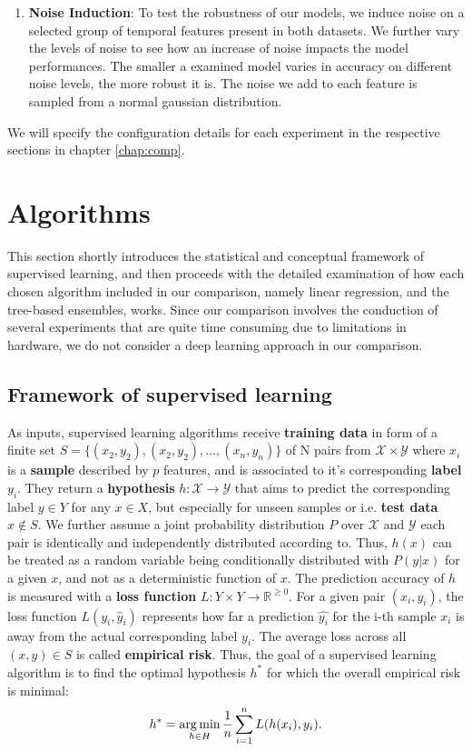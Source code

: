 \begin{enumerate}
	\item \textbf{Noise Induction}: To test the robustness of our models, we induce noise on a selected group of temporal features present in both datasets. We further vary the levels of noise to see how an increase of noise impacts the model performances. The smaller a examined model varies in accuracy on different noise levels, the more robust it is. The noise we add to each feature is sampled from a normal gaussian distribution. 
\end{enumerate}
We will specify the configuration details for each experiment in the respective sections in chapter \ref{chap:comp}.
\section{Algorithms}
This section shortly introduces the statistical and conceptual framework of supervised learning, and then proceeds with the detailed examination of how each chosen algorithm included in our comparison, namely linear regression, and the tree-based ensembles, works. Since our comparison involves the conduction of several experiments that are quite time consuming due to limitations in hardware, we do not consider a deep learning approach in our comparison. 

\subsection{Framework of supervised learning}
As inputs, supervised learning algorithms receive \textbf{training data} in form of a finite set $ S = \{({x}_{2}, y_2), ({x}_{2}, y_2), \dots, ({x}_{n}, y_n)\}$ of N pairs from $ \mathcal{X} \times \mathcal{Y} $ where $ x_i $ is a \textbf{sample} described by $ p $ features, and is associated to it's corresponding \textbf{label} $ y_i $.
They return a \textbf{hypothesis} $ h: \mathcal{X} \to \mathcal{Y} $ that aims to predict the corresponding label $ y \in Y $ for any $ x \in X $, but especially for unseen samples or i.e. \textbf{test data} $ x \notin S $.
We further assume a joint probability distribution $ P $ over $ \mathcal{X} $ and $ \mathcal{Y} $ each pair is identically and independently distributed according to. 
Thus, $ h(x) $ can be treated as a random variable being conditionally distributed with $ P(y | x) $ for a given $ x $, and not as a deterministic function of $ x $. 
The prediction accuracy of $ h $ is measured with a  \textbf{loss function} $ L : Y \times Y \to \mathbb{R}^{\geq 0}$.
For a given pair $ ({x}_i, y_i) $, the loss function $ L(y_i, \hat{y}_i) $ represents how far a prediction $ \hat{y_i} $ for the i-th sample $ x_i $ is away from the actual corresponding label $ y_i $. 
The average loss across all $ (x,y) \in S $ is called \textbf{empirical risk}.
Thus, the goal of a supervised learning algorithm is to find the optimal hypothesis $ h^* $ for which the overall empirical risk is minimal: 
\begin{equation}
	h^* = \operatorname*{arg\,min}_{h \in H} \dfrac{1}{n} \sum_{i=1}^{n} L(h(x_i), y_i).
\end{equation}

